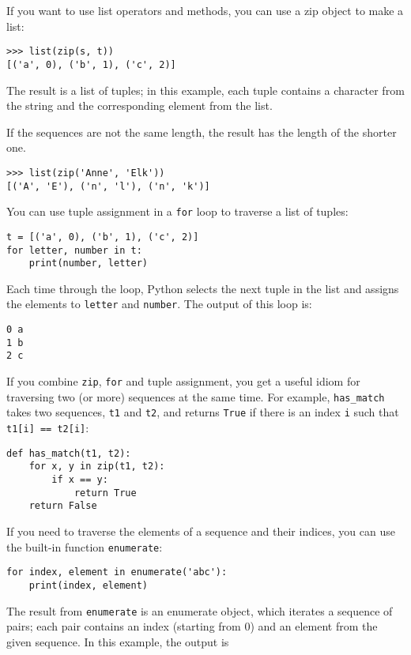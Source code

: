 \documentclass[10pt]{book}
\begin{document}
If you want to use list operators and methods, you can
use a zip object to make a list:

\begin{verbatim}
>>> list(zip(s, t))
[('a', 0), ('b', 1), ('c', 2)]
\end{verbatim}
%
The result is a list of tuples; in this example, each tuple contains
a character from the string and the corresponding element from
the list.

If the sequences are not the same length, the result has the
length of the shorter one.

\begin{verbatim}
>>> list(zip('Anne', 'Elk'))
[('A', 'E'), ('n', 'l'), ('n', 'k')]
\end{verbatim}
%
You can use tuple assignment in a {\tt for} loop to traverse a list of
tuples:

\begin{verbatim}
t = [('a', 0), ('b', 1), ('c', 2)]
for letter, number in t:
    print(number, letter)
\end{verbatim}
%
Each time through the loop, Python selects the next tuple in
the list and assigns the elements to {\tt letter} and 
{\tt number}.  The output of this loop is:

\begin{verbatim}
0 a
1 b
2 c
\end{verbatim}
%
If you combine {\tt zip}, {\tt for} and tuple assignment, you get a
useful idiom for traversing two (or more) sequences at the same
time.  For example, \verb"has_match" takes two sequences, {\tt t1} and
{\tt t2}, and returns {\tt True} if there is an index {\tt i}
such that {\tt t1[i] == t2[i]}:

\begin{verbatim}
def has_match(t1, t2):
    for x, y in zip(t1, t2):
        if x == y:
            return True
    return False
\end{verbatim}
%
If you need to traverse the elements of a sequence and their
indices, you can use the built-in function {\tt enumerate}:

\begin{verbatim}
for index, element in enumerate('abc'):
    print(index, element)
\end{verbatim}
%
The result from {\tt enumerate} is an enumerate object, which
iterates a sequence of pairs; each pair contains an index (starting
from 0) and an element from the given sequence.
In this example, the output is
\end{document}

